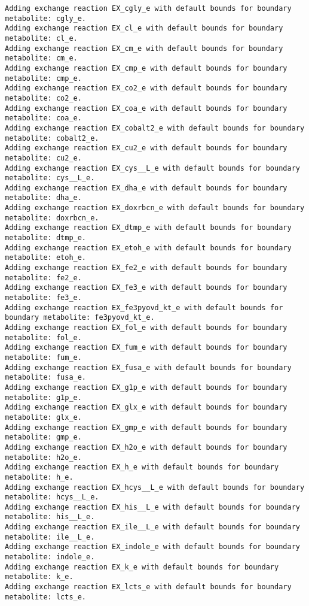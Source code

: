 \documentclass[
  letterpaper,
  DIV=11,
  numbers=noendperiod]{scrartcl}
\begin{document}
\begin{verbatim}
Adding exchange reaction EX_cgly_e with default bounds for boundary metabolite: cgly_e.
Adding exchange reaction EX_cl_e with default bounds for boundary metabolite: cl_e.
Adding exchange reaction EX_cm_e with default bounds for boundary metabolite: cm_e.
Adding exchange reaction EX_cmp_e with default bounds for boundary metabolite: cmp_e.
Adding exchange reaction EX_co2_e with default bounds for boundary metabolite: co2_e.
Adding exchange reaction EX_coa_e with default bounds for boundary metabolite: coa_e.
Adding exchange reaction EX_cobalt2_e with default bounds for boundary metabolite: cobalt2_e.
Adding exchange reaction EX_cu2_e with default bounds for boundary metabolite: cu2_e.
Adding exchange reaction EX_cys__L_e with default bounds for boundary metabolite: cys__L_e.
Adding exchange reaction EX_dha_e with default bounds for boundary metabolite: dha_e.
Adding exchange reaction EX_doxrbcn_e with default bounds for boundary metabolite: doxrbcn_e.
Adding exchange reaction EX_dtmp_e with default bounds for boundary metabolite: dtmp_e.
Adding exchange reaction EX_etoh_e with default bounds for boundary metabolite: etoh_e.
Adding exchange reaction EX_fe2_e with default bounds for boundary metabolite: fe2_e.
Adding exchange reaction EX_fe3_e with default bounds for boundary metabolite: fe3_e.
Adding exchange reaction EX_fe3pyovd_kt_e with default bounds for boundary metabolite: fe3pyovd_kt_e.
Adding exchange reaction EX_fol_e with default bounds for boundary metabolite: fol_e.
Adding exchange reaction EX_fum_e with default bounds for boundary metabolite: fum_e.
Adding exchange reaction EX_fusa_e with default bounds for boundary metabolite: fusa_e.
Adding exchange reaction EX_g1p_e with default bounds for boundary metabolite: g1p_e.
Adding exchange reaction EX_glx_e with default bounds for boundary metabolite: glx_e.
Adding exchange reaction EX_gmp_e with default bounds for boundary metabolite: gmp_e.
Adding exchange reaction EX_h2o_e with default bounds for boundary metabolite: h2o_e.
Adding exchange reaction EX_h_e with default bounds for boundary metabolite: h_e.
Adding exchange reaction EX_hcys__L_e with default bounds for boundary metabolite: hcys__L_e.
Adding exchange reaction EX_his__L_e with default bounds for boundary metabolite: his__L_e.
Adding exchange reaction EX_ile__L_e with default bounds for boundary metabolite: ile__L_e.
Adding exchange reaction EX_indole_e with default bounds for boundary metabolite: indole_e.
Adding exchange reaction EX_k_e with default bounds for boundary metabolite: k_e.
Adding exchange reaction EX_lcts_e with default bounds for boundary metabolite: lcts_e.

\end{verbatim}
\end{document}
